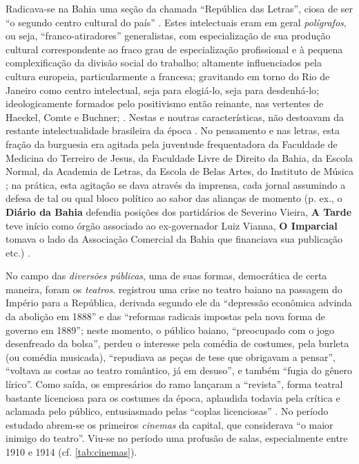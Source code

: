 Radicava-se na Bahia uma seção da chamada ``República das Letras'', ciosa de ser ``o segundo centro cultural do país'' \cite[p.~263]{machadoneto_bahiaint_1972}. Estes intelectuais eram em geral \textit{polígrafos}, ou seja, ``franco-atiradores'' generalistas, com especialização de sua produção cultural correspondente ao fraco grau de especialização profissional e à pequena complexificação da divisão social do trabalho; altamente influenciados pela cultura europeia, particularmente a francesa; gravitando em torno do Rio de Janeiro como centro intelectual, seja para elogiá-lo, seja para desdenhá-lo; ideologicamente formados pelo positivismo então reinante, nas vertentes de Haeckel, Comte e Buchner;  \cite{MachadoNeto1966,machadoneto_bahiaint_1972}.  Nestas e noutras características, não destoavam da restante intelectualidade brasileira da época \cite{martins_intelv5_1977,martins_intelv6_1978}. No pensamento e nas letras, esta fração da burguesia era agitada pela juventude frequentadora da Faculdade de Medicina do Terreiro de Jesus, da Faculdade Livre de Direito da Bahia, da Escola Normal, da Academia de Letras, da Escola de Belas Artes, do Instituto de Música \cite[p.~272]{machadoneto_bahiaint_1972}; na prática, esta agitação se dava através da imprensa, cada jornal assumindo a defesa de tal ou qual bloco político ao sabor das alianças de momento (p. ex., o \textbf{Diário da Bahia} defendia posições dos partidários de Severino Vieira, \textbf{A Tarde} teve início como órgão associado ao ex-governador Luiz Vianna, \textbf{O Imparcial} tomava o lado da Associação Comercial da Bahia que financiava sua publicação etc.) \cite{souza_imprensa_1972,machadoneto_bahiaint_1972}.

No campo das \textit{diversões públicas}, uma de suas formas, democrática de certa maneira, foram os \textit{teatros}.  registrou uma crise no teatro baiano na passagem do Império para a República, derivada segundo ele da ``depressão econômica advinda da abolição em 1888'' e das ``reformas radicais impostas pela nova forma de governo em 1889''; neste momento, o público baiano, ``preocupado com o jogo desenfreado da bolsa'', perdeu o interesse pela comédia de costumes, pela burleta (ou comédia musicada), ``repudiava as peças de tese que obrigavam a pensar'', ``voltava as costas ao teatro romântico, já em desuso'', e também ``fugia do gênero lírico''. Como saída, os empresários do ramo lançaram a ``revista'', forma teatral bastante licenciosa para os costumes da época, aplaudida todavia pela crítica e aclamada pelo público, entusiasmado pelas ``coplas licenciosas'' \cite[p.~48-49]{ruy_teatro_1959}. No período estudado abrem-se os primeiros \textit{cinemas} da capital, que  considerava ``o maior inimigo do teatro''. Viu-se no período uma profusão de salas, especialmente entre 1910 e 1914 (cf. \autoref{tab:cinemas}).


